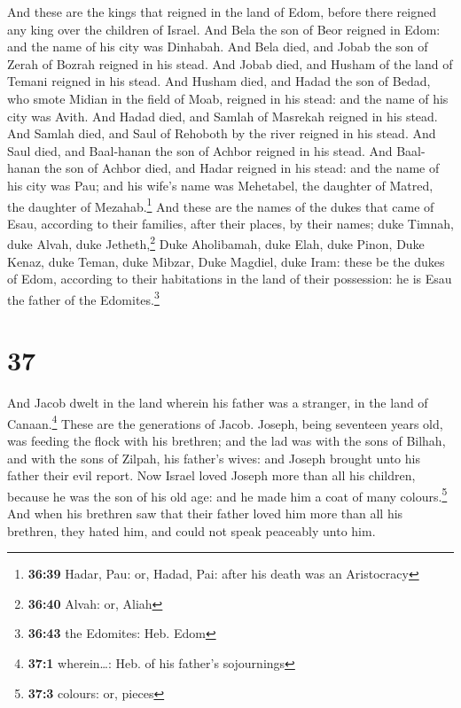  And these are the kings that reigned in the land of
Edom, before there reigned any king over the children of Israel.
 And Bela the son of Beor reigned in Edom: and the name
of his city was Dinhabah.  And Bela died, and Jobab the
son of Zerah of Bozrah reigned in his stead.  And Jobab
died, and Husham of the land of Temani reigned in his stead.
 And Husham died, and Hadad the son of Bedad, who smote
Midian in the field of Moab, reigned in his stead: and the name of his
city was Avith.  And Hadad died, and Samlah of Masrekah
reigned in his stead.  And Samlah died, and Saul of
Rehoboth by the river reigned in his stead.  And Saul
died, and Baal-hanan the son of Achbor reigned in his stead.
 And Baal-hanan the son of Achbor died, and Hadar reigned
in his stead: and the name of his city was Pau; and his wife's name was
Mehetabel, the daughter of Matred, the daughter of Mezahab.\footnote{\textbf{36:39}
  Hadar, Pau: or, Hadad, Pai: after his death was an Aristocracy}
 And these are the names of the dukes that came of Esau,
according to their families, after their places, by their names; duke
Timnah, duke Alvah, duke Jetheth,\footnote{\textbf{36:40} Alvah: or,
  Aliah}  Duke Aholibamah, duke Elah, duke Pinon,
 Duke Kenaz, duke Teman, duke Mibzar, 
Duke Magdiel, duke Iram: these be the dukes of Edom, according to their
habitations in the land of their possession: he is Esau the father of
the Edomites.\footnote{\textbf{36:43} the Edomites: Heb. Edom}

\hypertarget{section-36}{%
\section{37}\label{section-36}}

 And Jacob dwelt in the land wherein his father was a
stranger, in the land of Canaan.\footnote{\textbf{37:1} wherein\ldots:
  Heb. of his father's sojournings}  These are the
generations of Jacob. Joseph, being seventeen years old, was feeding the
flock with his brethren; and the lad was with the sons of Bilhah, and
with the sons of Zilpah, his father's wives: and Joseph brought unto his
father their evil report.  Now Israel loved Joseph more
than all his children, because he was the son of his old age: and he
made him a coat of many colours.\footnote{\textbf{37:3} colours: or,
  pieces}  And when his brethren saw that their father
loved him more than all his brethren, they hated him, and could not
speak peaceably unto him.

